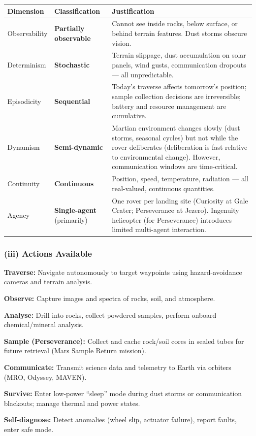 \documentclass[12pt, a4paper]{article}
\begin{document}
\begin{center}
\renewcommand{\arraystretch}{1.3}
\begin{tabular}{l|l|l}
\toprule
\textbf{Dimension} & \textbf{Classification} & \textbf{Justification} \\
\midrule
Observability & \textbf{Partially observable} & Cannot see inside rocks, below surface, or behind terrain features. Dust storms obscure vision. \\
Determinism & \textbf{Stochastic} & Terrain slippage, dust accumulation on solar panels, wind gusts, communication dropouts — all unpredictable. \\
Episodicity & \textbf{Sequential} & Today's traverse affects tomorrow's position; sample collection decisions are irreversible; battery and resource management are cumulative. \\
Dynamism & \textbf{Semi-dynamic} & Martian environment changes slowly (dust storms, seasonal cycles) but not while the rover deliberates (deliberation is fast relative to environmental change). However, communication windows are time-critical. \\
Continuity & \textbf{Continuous} & Position, speed, temperature, radiation — all real-valued, continuous quantities. \\
Agency & \textbf{Single-agent} (primarily) & One rover per landing site (Curiosity at Gale Crater; Perseverance at Jezero). Ingenuity helicopter (for Perseverance) introduces limited multi-agent interaction. \\
\bottomrule
\end{tabular}
\end{center}

\subsubsection*{(iii) Actions Available}

\begin{keypoints}
  \item \textbf{Traverse:} Navigate autonomously to target waypoints using hazard-avoidance cameras and terrain analysis.
  \item \textbf{Observe:} Capture images and spectra of rocks, soil, and atmosphere.
  \item \textbf{Analyse:} Drill into rocks, collect powdered samples, perform onboard chemical/mineral analysis.
  \item \textbf{Sample (Perseverance):} Collect and cache rock/soil cores in sealed tubes for future retrieval (Mars Sample Return mission).
  \item \textbf{Communicate:} Transmit science data and telemetry to Earth via orbiters (MRO, Odyssey, MAVEN).
  \item \textbf{Survive:} Enter low-power ``sleep'' mode during dust storms or communication blackouts; manage thermal and power states.
  \item \textbf{Self-diagnose:} Detect anomalies (wheel slip, actuator failure), report faults, enter safe mode.
\end{keypoints}
\end{document}
